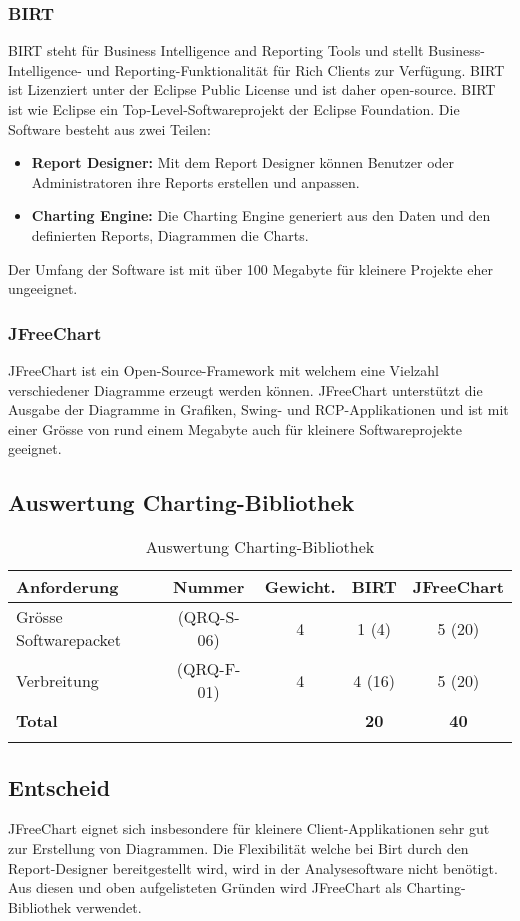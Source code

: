 \subsubsection{BIRT}
BIRT steht für Business Intelligence and Reporting Tools und stellt Business-Intelligence- und Reporting-Funktionalität für Rich Clients zur Verfügung. BIRT ist Lizenziert unter der Eclipse Public License und ist daher open-source. BIRT ist wie Eclipse ein Top-Level-Softwareprojekt der Eclipse Foundation. Die Software besteht aus zwei Teilen:
\begin{itemize}
\item \textbf{Report Designer: }Mit dem Report Designer können Benutzer oder Administratoren ihre Reports erstellen und anpassen. 
\item \textbf{Charting Engine: }Die Charting Engine generiert aus den Daten und den definierten Reports, Diagrammen die Charts.
\end{itemize} 

Der Umfang der Software ist mit über 100 Megabyte für kleinere Projekte eher ungeeignet.

\subsubsection{JFreeChart}
JFreeChart ist ein Open-Source-Framework mit welchem eine Vielzahl verschiedener Diagramme erzeugt werden können. JFreeChart unterstützt die Ausgabe der Diagramme in Grafiken, Swing- und RCP-Applikationen und ist mit einer Grösse von rund einem Megabyte auch für kleinere Softwareprojekte geeignet.

\subsection{Auswertung Charting-Bibliothek}
\begin{longtable}{|p{4cm}|c|c|c|c|}\hline
 \textbf{Anforderung} & \textbf{Nummer} &  \textbf{Gewicht.} & \textbf{BIRT} & \textbf{JFreeChart}\\\hline
   Grösse Softwarepacket & (QRQ-S-06) & 4 & 1 (4) & 5 (20) \\\hline
   Verbreitung & (QRQ-F-01) & 4 & 4 (16) & 5 (20) \\\hline
   \textbf{Total} & && \textbf{20}  & \textbf{40} \\\hline
    \caption{Auswertung Charting-Bibliothek}
\end{longtable}

\subsection{Entscheid}
JFreeChart eignet sich insbesondere für kleinere Client-Applikationen sehr gut zur Erstellung von Diagrammen. Die Flexibilität welche bei Birt durch den Report-Designer bereitgestellt wird, wird in der Analysesoftware nicht benötigt. Aus diesen und oben aufgelisteten Gründen wird JFreeChart als Charting-Bibliothek verwendet.
